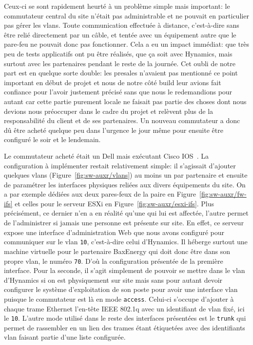\documentclass[12pt, oneside, a4paper, titlepage]{report}
\begin{document}
Ceux-ci se sont rapidement heurté à un problème simple mais important: le
commutateur central du site n'était pas administrable et ne pouvait en
particulier pas gérer les \glspl{vlan}. Toute communication effectuée à
distance, c'est-à-dire sans être relié directement par un câble, et tentée avec
un équipement autre que le pare-feu ne pouvait donc pas fonctionner. Cela a eu
un impact immédiat: que très peu de tests applicatifs ont pu être réalisés, que
ça soit avec Hynamics, mais surtout avec les partenaires pendant le reste de la
journée. Cet oubli de notre part est en quelque sorte double: les \gls{presales}
n'avaient pas mentionné ce point important en début de projet et nous de notre
côté \gls{build} leur avions fait confiance pour l'avoir justement précisé sans
que nous le redemandions pour autant car cette partie purement locale ne faisait
pas partie des choses dont nous devions nous préoccuper dans le cadre du projet
et relèvent plus de la responsabilité du client et de ses partenaires.  Un
nouveau commutateur a donc dû être acheté quelque peu dans l'urgence le jour
même pour ensuite être configuré le soir et le lendemain.

Le commutateur acheté était un Dell mais exécutant Cisco IOS~\cite{cisco-ios}.
La configuration à implémenter restait relativement simple: il s'agissait
d'ajouter quelques \glspl{vlan} (Figure~\ref{fig:sw-auxr/vlans}) au moins un par
partenaire et ensuite de paramétrer les interfaces physiques reliées aux divers
équipements du site. On a par exemple dédiées aux deux pares-feux de la paire en
Figure~\ref{fig:sw-auxr/fw-ifs} et celles pour le serveur ESXi en
Figure~\ref{fig:sw-auxr/esxi-ifs}. Plus précisément, ce dernier n'en a en
réalité qu'une qui lui est affectée, l'autre permet de l'administrer si jamais
une personne est présente sur site. En effet, ce serveur expose une interface
d'administration Web que nous avons configuré pour communiquer sur le \gls{vlan}
\texttt{10}, c'est-à-dire celui d'Hynamics. Il héberge surtout une machine
virtuelle pour le partenaire BaxEnergy qui doit donc être dans son propre
\gls{vlan}, le numéro \texttt{70}. D'où la configuration présentée de la
première interface. Pour la seconde, il s'agit simplement de pouvoir se mettre
dans le \gls{vlan} d'Hynamics si on est physiquement sur site mais sans pour
autant devoir configurer le système d'exploitation de son poste pour avoir une
interface \gls{vlan} puisque le commutateur est là en mode \texttt{access}.
Celui-ci s'occupe d'ajouter à chaque trame Ethernet l'en-tête IEEE 802.1q avec
un identifiant de \gls{vlan} fixé, ici le \texttt{10}. L'autre mode utilisé dans
le reste des interfaces présentées est le \texttt{trunk} qui permet de
rassembler en un lien des trames étant étiquetées avec des identifiants
\gls{vlan} faisant partie d'une liste configurée.
\end{document}
